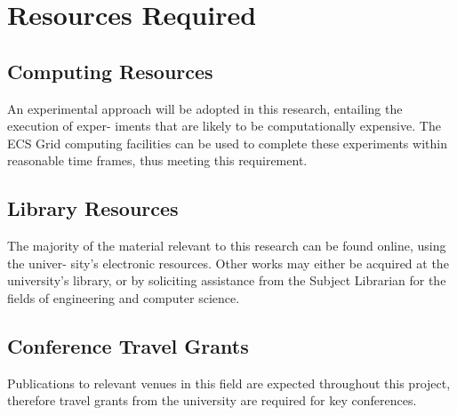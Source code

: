 \section{Resources Required}
\subsection{Computing Resources}
An experimental approach will be adopted in this research, entailing the execution of exper-
iments that are likely to be computationally expensive. The ECS Grid computing facilities
can be used to complete these experiments within reasonable time frames, thus meeting this requirement.
\subsection{Library Resources}
The majority of the material relevant to this research can be found online, using the univer-
sity’s electronic resources. Other works may either be acquired at the university’s library, or
by soliciting assistance from the Subject Librarian for the fields of engineering and computer science.
\subsection{Conference Travel Grants}
Publications to relevant venues in this field are expected throughout this project, therefore
travel grants from the university are required for key conferences.